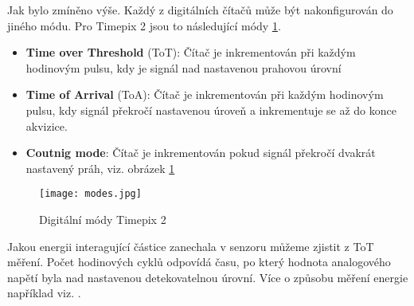 Jak bylo zmíněno výše. Každý z digitálních čítačů může být nakonfigurován do jiného módu. Pro Timepix 2 jsou to následující módy \ref{fig:modes}. 
\begin{itemize}
	\item \textbf{Time over Threshold} (ToT): Čítač je inkrementován při každým hodinovým pulsu, kdy je signál nad nastavenou prahovou úrovní
	\item \textbf{Time of Arrival} (ToA): Čítač je inkrementován při každým hodinovým pulsu, kdy signál překročí nastavenou úroveň a inkrementuje se až do konce akvizice.
	\item \textbf{Coutnig mode}: Čítač je inkrementován pokud signál překročí dvakrát nastavený práh, viz. obrázek \ref{fig:modes} 
\end{itemize}
\begin{figure}[h!]
	\centering
	\captionsetup{justification=centering}
	\texttt{[image: modes.jpg]}
	\caption{Digitální módy Timepix 2 \cite{Manek}} 
	\label{fig:modes}
\end{figure}	

Jakou energii interagující částice zanechala v senzoru můžeme zjistit z ToT měření. Počet hodinových cyklů odpovídá času, po který hodnota analogového napětí byla nad nastavenou detekovatelnou úrovní. Více o způsobu měření energie například viz. \cite{JAKUBEK2011S262}.




 


